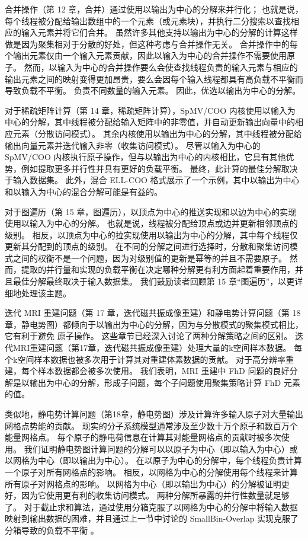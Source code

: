 合并操作（第 12 章，合并）通过使用以输出为中心的分解来并行化； 也就是说，每个线程被分配给输出数组中的一个元素（或元素块），并执行二分搜索以查找相应的输入元素并将它们合并。 虽然许多其他支持以输出为中心的分解的计算这样做是因为聚集相对于分散的好处，但这种考虑与合并操作无关。 合并操作中的每个输出元素仅由一个输入元素贡献，因此以输入为中心的合并操作不需要使用原子。 然而，以输入为中心的合并操作要么会使查找线程负责的输入元素与相应的输出元素之间的映射变得更加昂贵，要么会因每个输入线程都具有高负载不平衡而导致负载不平衡。 负责不同数量的输入元素。 因此，优选以输出为中心的分解。

对于稀疏矩阵计算（第 14 章，稀疏矩阵计算），SpMV/COO 内核使用以输入为中心的分解，其中线程被分配给输入矩阵中的非零值，并自动更新输出向量中的相应元素（分散访问模式）。 其余内核使用以输出为中心的分解，其中线程被分配给输出向量元素并迭代输入非零（收集访问模式）。 尽管以输入为中心的 SpMV/COO 内核执行原子操作，但与以输出为中心的内核相比，它具有其他优势，例如提取更多并行性并具有更好的负载平衡。 最终，此计算的最佳分解取决于输入数据集。 此外，混合 ELL-COO 格式展示了一个示例，其中以输出为中心和以输入为中心的混合分解可能是有益的。

对于图遍历（第 15 章，图遍历），以顶点为中心的推送实现和以边为中心的实现使用以输入为中心的分解。 也就是说，线程被分配给顶点或边并更新相邻顶点的级别。 相反，以顶点为中心的拉实现使用以输出为中心的分解，其中每个线程仅更新其分配到的顶点的级别。 在不同的分解之间进行选择时，分散和聚集访问模式之间的权衡不是一个问题，因为对级别值的更新是幂等的并且不需要原子。 然而，提取的并行量和实现的负载平衡在决定哪种分解更有利方面起着重要作用，并且最佳分解最终取决于输入数据集。 我们鼓励读者回顾第 15 章“图遍历”，以更详细地处理该主题。

迭代 MRI 重建问题（第 17 章，迭代磁共振成像重建）和静电势计算问题（第 18 章，静电势图）都倾向于以输出为中心的分解，因为与分散模式的聚集模式相比，它有利于避免 原子操作。 这些章节已经深入讨论了两种分解策略之间的区别。 迭代MRI重建问题（第17章，迭代磁共振成像重建）处理大量的k空间样本数据。 每个k空间样本数据也被多次用于计算其对重建体素数据的贡献。 对于高分辨率重建，每个样本数据都会被多次使用。 我们表明，MRI 重建中 FhD 问题的良好分解是以输出为中心的分解，形成子问题，每个子问题使用聚集策略计算 FhD 元素的值。

类似地，静电势计算问题（第18章，静电势图）涉及计算许多输入原子对大量输出网格点势能的贡献。 现实的分子系统模型通常涉及至少数十万个原子和数百万个能量网格点。 每个原子的静电荷信息在计算其对能量网格点的贡献时被多次使用。 我们证明静电势图计算问题的分解可以以原子为中心（即以输入为中心）或以网格为中心（即以输出为中心）。 在以原子为中心的分解中，每个线程负责计算一个原子对所有网格点的影响。 相反，以网格为中心的分解使用每个线程来计算所有原子对网格点的影响。 以网格为中心（即以输出为中心）的分解被证明更好，因为它使用更有利的收集访问模式。 两种分解所暴露的并行性数量就足够了。 对于截止求和算法，通过使用分箱克服了以网格为中心的分解中将输入数据映射到输出数据的困难，并且通过上一节中讨论的 SmallBin-Overlap 实现克服了分箱导致的负载不平衡 。

